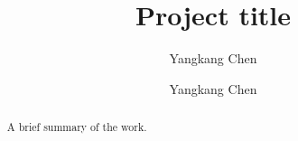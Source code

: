 \documentclass[manuscript,revised]{geophysics}
\begin{document}
\title{Project title}
\author{Yangkang Chen}

\renewcommand{\thefootnote}{\fnsymbol{footnote}}

\author{Yangkang Chen\footnotemark[1]}


\address{
\footnotemark[1]
School of Earth Sciences\\
Zhejiang University\\
Hangzhou, Zhejiang Province, China, 310027\\
yangkang.chen@zju.edu.cn 
}


\begin{abstract}
A brief summary of the work.
\end{abstract}
\end{document}
